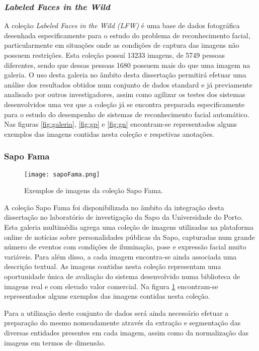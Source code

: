 \subsubsection{\textit{Labeled Faces in the Wild}}
A coleção \textit{Labeled Faces in the Wild (LFW)} é uma base de dados fotográfica desenhada especificamente para o estudo do problema de reconhecimento facial, particularmente em situações onde as condições de captura das imagens não possuem restrições. Esta coleção possuí 13233 imagens, de 5749 pessoas diferentes, sendo que dessas pessoas 1680 possuem mais do que uma imagem na galeria. O uso desta galeria no âmbito desta dissertação permitirá efetuar uma análise dos resultados obtidos num conjunto de dados standard e já previamente analisado por outros investigadores, assim como agilizar os testes dos sistemas desenvolvidos uma vez que a coleção já se encontra preparada especificamente para o estudo do desempenho de sistemas de reconhecimento facial automático. Nas figuras \ref{fig:galeria}, \ref{fig:gp} e \ref{fig:gn} encontram-se representados alguns exemplos das imagens contidas nesta coleção e respetivas anotações.

\subsubsection{Sapo Fama}
\begin{figure}[ht]
  \begin{center}
    \leavevmode
    \texttt{[image: sapoFama.png]}
    \caption{Exemplos de imagens da coleção Sapo Fama.}	
    \label{fig:sapoFama}
  \end{center}
\end{figure}
A coleção Sapo Fama foi disponibilizada no âmbito da integração desta dissertação no laboratório de investigação da Sapo da Universidade do Porto. Esta galeria multimédia agrega uma coleção de imagens utilizadas na plataforma online de notícias sobre personalidades públicas da Sapo, capturadas num grande número de eventos com condições de iluminação, pose e expressão facial muito variáveis. Para além disso, a cada imagem encontra-se ainda associada uma descrição textual. As imagens contidas nesta coleção representam uma oportunidade única de avaliação do sistema desenvolvido numa biblioteca de imagens real e com elevado valor comercial. Na figura \ref{fig:sapoFama} encontram-se representados alguns exemplos das imagens contidas nesta coleção.

Para a utilização deste conjunto de dados será ainda necessário efetuar a preparação do mesmo nomeadamente através da extração e segmentação das diversas entidades presentes em cada imagem, assim como da normalização das imagens em termos de dimensão.

